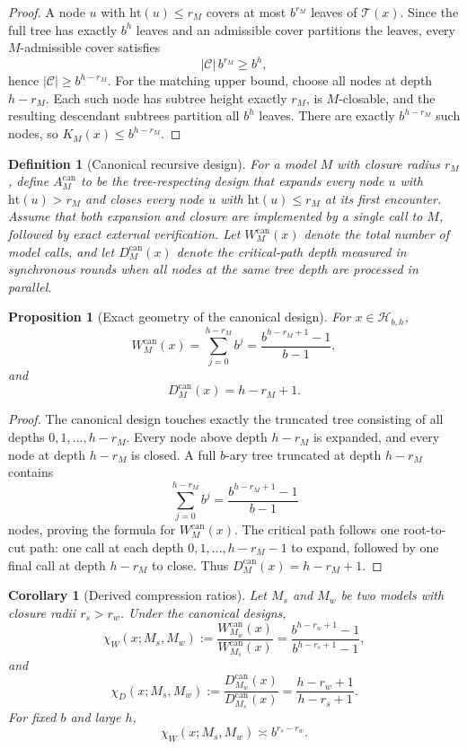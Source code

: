 \documentclass[10pt]{article}
\theoremstyle{paperplain}
\newtheorem{proposition}[theorem]{Proposition}
\newtheorem{corollary}[theorem]{Corollary}
\theoremstyle{paperdefinition}
\newtheorem{definition}[theorem]{Definition}
\theoremstyle{paperremark}
\begin{document}
\begin{proof}
A node $u$ with $\mathrm{ht}(u)\le r_M$ covers at most $b^{r_M}$ leaves of $\mathcal T(x)$.
Since the full tree has exactly $b^h$ leaves and an admissible cover partitions the leaves, every $M$-admissible cover satisfies
\[
|\mathcal C|\, b^{r_M}\ge b^h,
\]
hence $|\mathcal C|\ge b^{h-r_M}$.
For the matching upper bound, choose all nodes at depth $h-r_M$.
Each such node has subtree height exactly $r_M$, is $M$-closable, and the resulting descendant subtrees partition all $b^h$ leaves.
There are exactly $b^{h-r_M}$ such nodes, so $K_M(x)\le b^{h-r_M}$.
\end{proof}

\begin{definition}[Canonical recursive design]
\label{def:canonical-recursive-design}
For a model $M$ with closure radius $r_M$, define $A_M^{\mathrm{can}}$ to be the tree-respecting design that expands every node $u$ with $\mathrm{ht}(u)>r_M$ and closes every node $u$ with $\mathrm{ht}(u)\le r_M$ at its first encounter.
Assume that both expansion and closure are implemented by a single call to $M$, followed by exact external verification.
Let $W_M^{\mathrm{can}}(x)$ denote the total number of model calls, and let $D_M^{\mathrm{can}}(x)$ denote the critical-path depth measured in synchronous rounds when all nodes at the same tree depth are processed in parallel.
\end{definition}

\begin{proposition}[Exact geometry of the canonical design]
\label{prop:canonical-geometry}
For $x\in\mathcal H_{b,h}$,
\[
W_M^{\mathrm{can}}(x)
=
\sum_{j=0}^{h-r_M} b^j
=
\frac{b^{h-r_M+1}-1}{b-1},
\]
and
\[
D_M^{\mathrm{can}}(x)=h-r_M+1.
\]
\end{proposition}

\begin{proof}
The canonical design touches exactly the truncated tree consisting of all depths $0,1,\dots,h-r_M$.
Every node above depth $h-r_M$ is expanded, and every node at depth $h-r_M$ is closed.
A full $b$-ary tree truncated at depth $h-r_M$ contains
\[
\sum_{j=0}^{h-r_M} b^j
=
\frac{b^{h-r_M+1}-1}{b-1}
\]
nodes, proving the formula for $W_M^{\mathrm{can}}(x)$.
The critical path follows one root-to-cut path: one call at each depth $0,1,\dots,h-r_M-1$ to expand, followed by one final call at depth $h-r_M$ to close.
Thus $D_M^{\mathrm{can}}(x)=h-r_M+1$.
\end{proof}

\begin{corollary}[Derived compression ratios]
\label{cor:derived-compression}
Let $M_s$ and $M_w$ be two models with closure radii $r_s>r_w$.
Under the canonical designs,
\[
\chi_W(x;M_s,M_w)
:=
\frac{W_{M_w}^{\mathrm{can}}(x)}{W_{M_s}^{\mathrm{can}}(x)}
=
\frac{b^{h-r_w+1}-1}{b^{h-r_s+1}-1},
\]
and
\[
\chi_D(x;M_s,M_w)
:=
\frac{D_{M_w}^{\mathrm{can}}(x)}{D_{M_s}^{\mathrm{can}}(x)}
=
\frac{h-r_w+1}{h-r_s+1}.
\]
For fixed $b$ and large $h$,
\[
\chi_W(x;M_s,M_w)\asymp b^{r_s-r_w}.
\]
\end{corollary}
\end{document}
